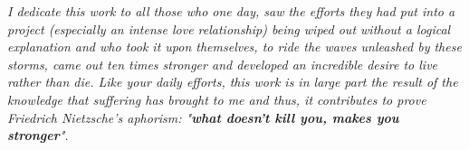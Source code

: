 \vspace*{5cm}
\begin{flushright}
\textit{I dedicate this work to all those who one day, saw the efforts they had put into a project (especially an intense love relationship) being wiped out without a logical explanation and who took it upon themselves, to ride the waves unleashed by these storms, came out ten times stronger and developed an incredible desire to live rather than die. Like your daily efforts, this work is in large part the result of the knowledge that suffering has brought to me and thus, it contributes to prove Friedrich Nietzsche's aphorism: "\textbf{what doesn't kill you, makes you stronger}".}
\end{flushright}

